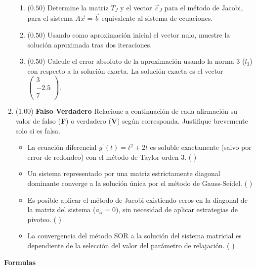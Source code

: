 \documentclass[12pt]{article}
\begin{document}
\begin{enumerate}[leftmargin=*,widest=9]
\begin{align*}
    \end{align*}
    \begin{enumerate}[label=\alph*]
    \item ($0.50$) Determine la matriz \(T_J\) y el vector \(\vec{c}_J\) para el método de Jacobi, para el sistema \(A\vec{x}=\vec{b}\) equivalente al sistema de ecuaciones.
    \vspace{2cm}
    \item ($0.50$) Usando como aproximación inicial el vector nulo, muestre la solución aproximada tras dos iteraciones.
    \vspace{5cm}
    \item ($0.50$) Calcule el error absoluto de la aproximación usando la norma 3 (\(l_3\)) con respecto a la solución exacta. La solución exacta es el vector
    \( \begin{pmatrix} 3 \\ -2.5 \\ 7 \end{pmatrix} \).
    \vspace{4cm}
    \end{enumerate}
    \item ($1.00$) \textbf{Falso Verdadero} Relacione a continuación de cada afirmación su valor de falso (\textbf{F}) o verdadero (\textbf{V}) según corresponda. Justifique brevemente solo si es falsa.
    \begin{itemize}
    \item La ecuación diferencial \(y^{\prime}(t)= t^2 + 2t\) es soluble exactamente (salvo por error de redondeo) con el método de Taylor orden 3. ( )
    \vspace{1cm}
    \item Un sistema representado por una matriz estrictamente diagonal dominante converge a la solución única por el método de Gauss-Seidel. ( )
    \vspace{1cm}
    \item Es posible aplicar el método de Jacobi existiendo ceros en la diagonal de la matriz del sistema (\(a_{ii}=0\)), sin necesidad de aplicar estrategias de pivoteo. ( )
    \vspace{1cm}
    \item La convergencia del método SOR a la solución del sistema matricial es dependiente de la selección del valor del parámetro de relajación. ( )
    \end{itemize}
  \end{enumerate}
  \textbf{Formulas}
%
\end{document}
